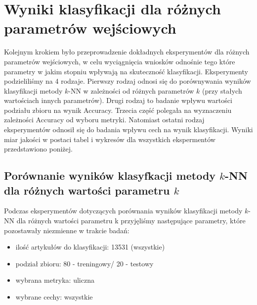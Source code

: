 \documentclass{classrep}
\begin{document}
\section{Wyniki klasyfikacji dla różnych parametrów wejściowych}
Kolejnym krokiem było przeprowadzenie dokładnych eksperymentów dla różnych parametrów wejściowych, w celu wyciągnięcia wniosków odnośnie tego które parametry w jakim stopniu wpływają na skuteczność klasyfikacji. Eksperymenty podzieliliśmy na 4 rodzaje. Pierwszy rodzaj odnosi się do porównywania wyników klasyfikacji metody $k$-NN w zależności od różnych parametrów $k$ (przy stałych wartościach innych parametrów). Drugi rodzaj to badanie wpływu wartości podziału zbioru na wynik Accuracy. Trzecia część polegała na wyznaczeniu zależności Accuracy od wyboru metryki. Natomiast ostatni rodzaj eksperymentów odnosił się do badania wpływu cech na wynik klasyfikacji. Wyniki miar jakości w postaci tabel i wykresów dla wszystkich ekspermentów przedstawiono poniżej.

\subsection{Porównanie wyników klasyfkacji metody $k$-NN dla różnych wartości parametru $k$}

Podczas eksperymentów dotyczących porównania wyników klasyfikacji metody $k$-NN dla różnych wartości parametru k przyjęliśmy następujące parametry, które pozostawały niezmienne w trakcie badań:
\begin{itemize}
    \item ilość artykułów do klasyfikacji: 13531 (wszystkie)
    \item podział zbioru: 80 - treningowy/ 20 - testowy
    \item wybrana metryka: uliczna
    \item wybrane cechy: wszystkie
\end{itemize}


\end{document}
